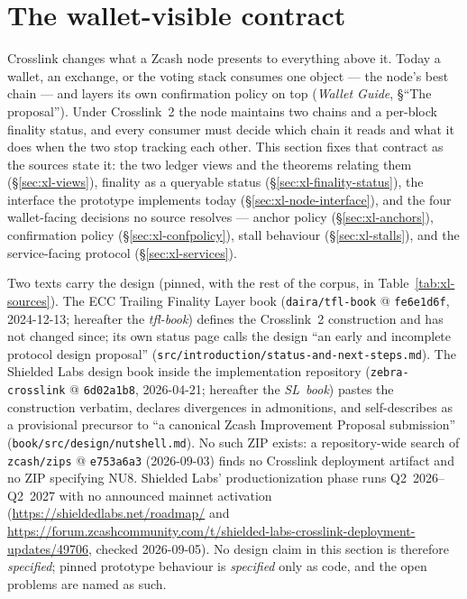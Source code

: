 \documentclass[11pt,a4paper]{article}
\theoremstyle{definition}
\begin{document}
\section{The wallet-visible contract}\label{sec:xl-contract}

Crosslink changes what a Zcash node presents to everything above it. Today a
wallet, an exchange, or the voting stack consumes one object --- the node's
best chain --- and layers its own confirmation policy on top (\emph{Wallet
Guide}, \S``The proposal''). Under Crosslink~2 the node maintains two chains
and a per-block finality status, and every consumer must decide which chain
it reads and what it does when the two stop tracking each other. This
section fixes that contract as the sources state it: the two ledger views
and the theorems relating them (\S\ref{sec:xl-views}), finality as a
queryable status (\S\ref{sec:xl-finality-status}), the interface the
prototype implements today (\S\ref{sec:xl-node-interface}), and the four
wallet-facing decisions no source resolves --- anchor policy
(\S\ref{sec:xl-anchors}), confirmation policy (\S\ref{sec:xl-confpolicy}),
stall behaviour (\S\ref{sec:xl-stalls}), and the service-facing protocol
(\S\ref{sec:xl-services}).

Two texts carry the design (pinned, with the rest of the corpus, in
Table~\ref{tab:xl-sources}). The ECC Trailing Finality Layer book
(\texttt{daira/tfl-book} @ \texttt{fe6e1d6f},
2024-12-13; hereafter the
\emph{tfl-book}) defines the Crosslink~2 construction and has not changed
since; its own status page calls the design ``an early and incomplete
protocol design proposal'' (\texttt{src/introduction/status-and-next-steps.md}).
The Shielded Labs design book inside the implementation repository
(\texttt{zebra-crosslink} @ \texttt{6d02a1b8}, 2026-04-21; hereafter the
\emph{SL~book}) pastes the construction verbatim, declares divergences in
admonitions, and self-describes as a provisional precursor to ``a canonical
Zcash Improvement Proposal submission'' (\texttt{book/src/design/nutshell.md}).
No such ZIP exists: a repository-wide search of \texttt{zcash/zips} @
\texttt{e753a6a3} (2026-09-03) finds no Crosslink deployment artifact and
no ZIP specifying NU8. Shielded Labs' productionization
phase runs Q2~2026--Q2~2027 with no announced mainnet activation
(\url{https://shieldedlabs.net/roadmap/} and
\url{https://forum.zcashcommunity.com/t/shielded-labs-crosslink-deployment-updates/49706},
checked 2026-09-05).
No design claim in this section is therefore \emph{specified}; pinned
prototype behaviour is \emph{specified} only as code, and the open problems
are named as such.
\end{document}

